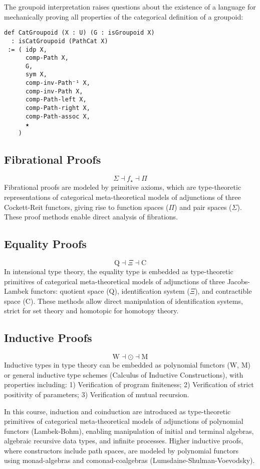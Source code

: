 \documentclass{article}
\begin{document}
The groupoid interpretation raises questions about the existence of a language for
mechanically proving all properties of the categorical definition of a groupoid:

\begin{lstlisting}
def CatGroupoid (X : U) (G : isGroupoid X)
  : isCatGroupoid (PathCat X)
 := ( idp X,
      comp-Path X,
      G,
      sym X,
      comp-inv-Path⁻¹ X,
      comp-inv-Path X,
      comp-Path-left X,
      comp-Path-right X,
      comp-Path-assoc X,
      ★
    )
\end{lstlisting}

\newpage
\subsection{Fibrational Proofs}
\[
\Sigma \dashv f_\star \dashv \Pi
\]
Fibrational proofs are modeled by primitive axioms, which are type-theoretic
representations of categorical meta-theoretical models of adjunctions of three
Cockett-Reit functors, giving rise to function spaces (\(\Pi\)) and pair
spaces (\(\Sigma\)). These proof methods enable direct analysis of fibrations.

\subsection{Equality Proofs}
\[
\mathrm{Q} \dashv \Xi \dashv \mathrm{C}
\]
In intensional type theory, the equality type is embedded as type-theoretic
primitives of categorical meta-theoretical models of adjunctions of three
Jacobs-Lambek functors: quotient space (\(\mathrm{Q}\)), identification
system (\(\Xi\)), and contractible space (\(\mathrm{C}\)). These methods allow
direct manipulation of identification systems, strict for set theory and
homotopic for homotopy theory.

\subsection{Inductive Proofs}
\[
\mathrm{W} \dashv \odot \dashv \mathrm{M}
\]
Inductive types in type theory can be embedded as polynomial
functors (\(\mathrm{W}\), \(\mathrm{M}\)) or general inductive type
schemes (Calculus of Inductive Constructions), with properties including:
1) Verification of program finiteness;
2) Verification of strict positivity of parameters;
3) Verification of mutual recursion.

In this course, induction and coinduction are introduced as type-theoretic
primitives of categorical meta-theoretical models of adjunctions of
polynomial functors (Lambek-Bohm), enabling manipulation of initial
and terminal algebras, algebraic recursive data types, and infinite
processes. Higher inductive proofs, where constructors include path
spaces, are modeled by polynomial functors using monad-algebras and
comonad-coalgebras (Lumsdaine-Shulman-Voevodsky).
\end{document}
